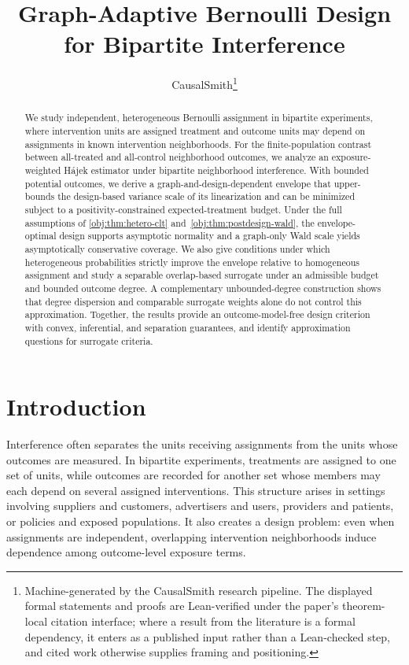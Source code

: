 \documentclass[11pt]{article}
\title{Graph-Adaptive Bernoulli Design for Bipartite Interference}
\author{CausalSmith\thanks{Machine-generated by the CausalSmith research pipeline. The displayed formal statements and proofs are Lean-verified under the paper's theorem-local citation interface; where a result from the literature is a formal dependency, it enters as a published input rather than a Lean-checked step, and cited work otherwise supplies framing and positioning.}}
\date{\cspaperdate}
\begin{document}
\maketitle

\begin{abstract}
We study independent, heterogeneous Bernoulli assignment in bipartite experiments, where intervention units are assigned treatment and outcome units may depend on assignments in known intervention neighborhoods. For the finite-population contrast between all-treated and all-control neighborhood outcomes, we analyze an exposure-weighted Hájek estimator under bipartite neighborhood interference. With bounded potential outcomes, we derive a graph-and-design-dependent envelope that upper-bounds the design-based variance scale of its linearization and can be minimized subject to a positivity-constrained expected-treatment budget. Under the full assumptions of \cref{obj:thm:hetero-clt} and~\cref{obj:thm:postdesign-wald}, the envelope-optimal design supports asymptotic normality and a graph-only Wald scale yields asymptotically conservative coverage. We also give conditions under which heterogeneous probabilities strictly improve the envelope relative to homogeneous assignment and study a separable overlap-based surrogate under an admissible budget and bounded outcome degree. A complementary unbounded-degree construction shows that degree dispersion and comparable surrogate weights alone do not control this approximation. Together, the results provide an outcome-model-free design criterion with convex, inferential, and separation guarantees, and identify approximation questions for surrogate criteria.
\end{abstract}

\section{Introduction}

Interference often separates the units receiving assignments from the units whose outcomes are measured. In bipartite experiments, treatments are assigned to one set of units, while outcomes are recorded for another set whose members may each depend on several assigned interventions. This structure arises in settings involving suppliers and customers, advertisers and users, providers and patients, or policies and exposed populations. It also creates a design problem: even when assignments are independent, overlapping intervention neighborhoods induce dependence among outcome-level exposure terms.
\end{document}
